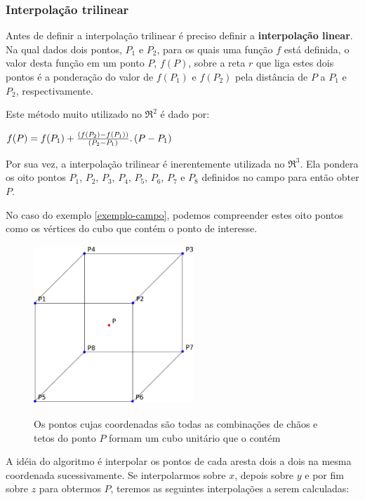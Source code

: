     \newpage
    \subsubsection{Interpolação trilinear}
    Antes de definir a interpolação trilinear é preciso definir a \textbf{interpolação linear}. Na qual dados dois pontos, $P_{1}$ e $P_{2}$, para os quais uma função $f$ está definida, o valor desta função em um ponto $P$, $f(P)$, sobre a reta $r$ que liga estes dois pontos é a ponderação do valor de $f(P_{1})$ e $f(P_{2})$ pela distância de $P$ a $P_{1}$ e $P_{2}$, respectivamente.
    
    Este método muito utilizado no $\Re ^{2}$ é dado por:
    
    $f(P) = f(P_{1}) + \frac{(f(P_{2}) - f(P_{1}))}{(P_{2} - P_{1})}\ldotp (P - P_{1})$
    
    Por sua vez, a interpolação trilinear é inerentemente utilizada no $\Re ^{3}$. Ela pondera os oito pontos $P_{1}$, $P_{2}$, $P_{3}$, $P_{4}$, $P_{5}$, $P_{6}$, $P_{7}$ e $P_{8}$ definidos no campo para então obter $P$.
    
    No caso do exemplo \ref{exemplo-campo}, podemos compreender estes oito pontos como os vértices do cubo que contém o ponto de interesse.
    
    \begin{figure}[!h]
      \begin{center}
         \includegraphics[width=60mm, height=60mm]{images/trilinearinterpolation.png}
         \label{fig:trilinearinterpolation}
         \caption{Os pontos cujas coordenadas são todas as combinações de chãos e tetos do ponto $P$ formam um cubo unitário que o contém}
      \end{center}
    \end{figure}
     
    A idéia do algoritmo é interpolar os pontos de cada aresta dois a dois na mesma coordenada sucessivamente. Se interpolarmos sobre $x$, depois sobre $y$ e por fim sobre $z$ para obtermos $P$, teremos as seguintes interpolações a serem calculadas:
    
